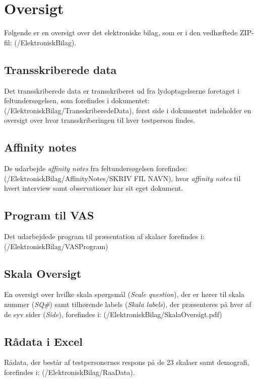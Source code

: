 \chapter{Oversigt}
\label{ElektroniskBilagOversigt}
%
Følgende er en oversigt over det elektroniske bilag, som er i den vedhæftede ZIP-fil: (/ElektroniskBilag).

\section{Transskriberede data}
\label{ElektroniskBilagTranskriberede}
%
Det transskriberede data er transskriberet ud fra lydoptagelserne foretaget i feltundersøgelsen, som forefindes i dokumentet: (/ElektroniskBilag/TransskriberedeData), først side i dokumentet indeholder en oversigt over hvor transskriberingen til hver testperson findes. 

\section{Affinity notes}
\label{ElektroniskBilagAffinityNotes}
%
De udarbejde \textit{affinity notes} fra feltundersøgelsen forefindes: (/ElektroniskBilag/AffinityNotes/SKRIV FIL NAVN), hvor \textit{affinity notes} til hvert interview samt observationer har sit eget dokument. 

\section{Program til VAS}
\label{ElektroniskBilagProgram}
%
Det udarbejdede program til præsentation af skalaer forefindes i: (/ElektroniskBilag/VASProgram)

\section{Skala Oversigt}
\label{ElektroniskBilagSkalaOversigt}
%
En oversigt over hvilke skala spørgsmål (\textit{Scale question}), der er hører til skala nummer (\textit{SQ\#}) samt tilhørende labels (\textit{Skala labels}), der præsenteres på hver af de syv sider (\textit{Side}), forefindes i: (/ElektroniskBilag/SkalaOversigt.pdf)



\section{Rådata i Excel}
\label{ElektroniskBilagExcel}
%
Rådata, der består af testpersonernes respons på de 23 skalaer samt demografi, forefindes i: (/ElektroniskBilag/RaaData).

